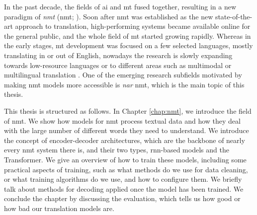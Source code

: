 In the past decade, the fields of \ac{ai} and \ac{mt} fused together, resulting
in a new paradigm of \emph{\acl{nmt}} (\acs{nmt};
\citealp{sutskever2014sequence,bahdanau2014neural}). Soon after \ac{nmt} was
established as the new state-of-the-art approach to translation,
high-performing systems became available online for the general public, and the
whole field of \ac{mt} started growing rapidly. Whereas in the early stages,
\ac{mt} development was focused on a few selected languages, mostly translating
in or out of English, nowadays the research is slowly expanding towards
low-resource languages or to different areas such as multimodal or multilingual
translation \citep{haddow2021survey, libovicky-helcl-2017-attention,
  aharoni-etal-2019-massively}. One of the emerging research subfields
motivated by making \ac{nmt} models more accessible is \emph{\acl{nar}}
\ac{nmt}, which is the main topic of this thesis.



\vspace{\baselineskip}

This thesis is structured as follows.
%
In Chapter \ref{chap:nmt}, we introduce the field of \ac{nmt}. We show how
models for \ac{nmt} process textual data and how they deal with the large
number of different words they need to understand. We introduce the concept of
encoder-decoder architectures, which are the backbone of nearly every \ac{nmt}
system there is, and their two types, \acs{rnn}-based models and the
Transformer. We give an overview of how to train these models, including some
practical aspects of training, such as what methods do we use for data
cleaning, or what training algorithms do we use, and how to configure them. We
briefly talk about methods for decoding applied once the model has been
trained. We conclude the chapter by discussing the evaluation, which tells us
how good or how bad our translation models are.

